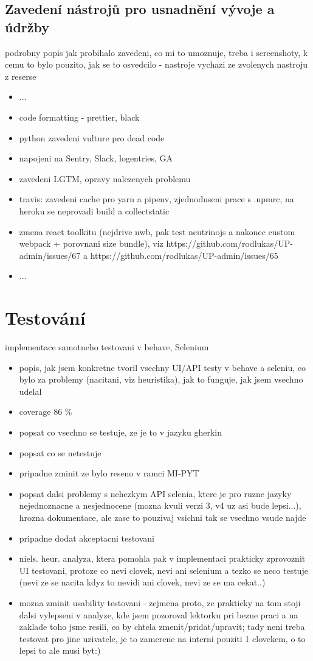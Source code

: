 \section{Zavedení nástrojů pro usnadnění vývoje a údržby}
podrobny popis jak probihalo zavedeni, co mi to umoznuje, treba i screenshoty, k cemu to bylo pouzito, jak se to osvedcilo - nastroje vychazi ze zvolenych nastroju z reserse
 
\begin{itemize}
\item ...
\item code formatting - prettier, black
\item python zavedeni vulture pro dead code
\item napojeni na Sentry, Slack, logentries, GA
\item zavedeni LGTM, opravy nalezenych problemu
\item travis: zavedeni cache pro yarn a pipenv, zjednoduseni prace s .npmrc, na heroku se neprovadi build a collectstatic
\item zmena react toolkitu (nejdrive nwb, pak test neutrinojs a nakonec custom webpack + porovnani size bundle), viz https://github.com/rodlukas/UP-admin/issues/67 a https://github.com/rodlukas/UP-admin/issues/65
\item ...
\end{itemize}


\chapter{Testování}
implementace samotneho testovani v behave, Selenium
\begin{itemize}
\item popis, jak jsem konkretne tvoril vsechny UI/API testy v behave a seleniu, co bylo za problemy (nacitani, viz heuristika), jak to funguje, jak jsem vsechno udelal
\item coverage 86 \%
\item popsat co vsechno se testuje, ze je to v jazyku gherkin
\item popsat co se netestuje
\item pripadne zminit ze bylo reseno v ramci MI-PYT
\item popsat dalsi problemy s nehezkym API selenia, ktere je pro ruzne jazyky nejednoznacne a nesjednocene (mozna kvuli verzi 3, v4 uz asi bude lepsi...), hrozna dokumentace, ale zase to pouzivaj vsichni tak se vsechno vsude najde
\item pripadne dodat akceptacni testovani
\item niels. heur. analyza, ktera pomohla pak v implementaci prakticky zprovoznit UI testovani, protoze co nevi clovek, nevi ani selenium a tezko se neco testuje (nevi ze se nacita kdyz to nevidi ani clovek, nevi ze se ma cekat..)
\item mozna zminit usability testovani - zejmena proto, ze prakticky na tom stoji dalsi vylepseni v analyze, kde jsem pozoroval lektorku pri bezne praci a na zaklade toho jsme resili, co by chtela zmenit/pridat/upravit; tady neni treba testovat pro jine uzivatele, je to zamerene na interni pouziti 1 clovekem, o to lepsi to ale musi byt:)
\end{itemize}


